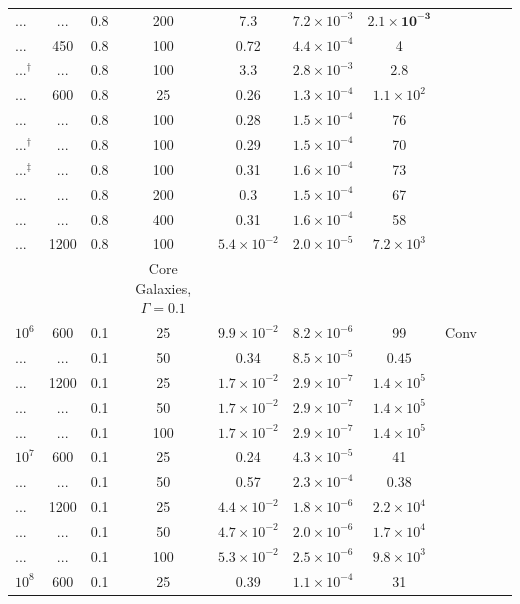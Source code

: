 \documentclass[usenatbib,fleqn]{mn2e}
\begin{document}
\begin{table}
\begin{threeparttable}
\begin{minipage}{18cm}
\begin{tabular}{lccccccccc}
... & ... & 0.8 & 200 & 7.3 & $ 7.2 \times 10^{ -3 }$ & $\mathbf{ 2.1  \times 10^{ -3 }}$ \\
... & 450 & 0.8 & 100 & 0.72 & $ 4.4 \times 10^{ -4 }$ & 4 \\
...$^{\dagger}$ & ... & 0.8 & 100 & 3.3 & $ 2.8 \times 10^{ -3 }$ & $\mathbf{2.8}$\\
... & 600 & 0.8 & 25 & 0.26 & $ 1.3 \times 10^{ -4 }$ & $ 1.1 \times 10^{ 2 }$ \\
... & ... & 0.8 & 100 & 0.28 & $ 1.5 \times 10^{ -4 }$ & 76 \\
...$^{\dagger}$ & ... & 0.8 & 100 & 0.29 & $ 1.5 \times 10^{ -4 }$ &70 \\
...$^{\ddagger}$ & ... & 0.8 & 100 & 0.31 & $ 1.6 \times 10^{ -4 }$ & 73 \\
... & ... & 0.8 & 200 & 0.3 & $ 1.5 \times 10^{ -4 }$ & 67 \\
... & ... & 0.8 & 400 & 0.31 & $ 1.6 \times 10^{ -4 }$ & 58 \\
... & 1200 & 0.8 & 100 & $ 5.4 \times 10^{ -2 }$ & $ 2.0 \times 10^{ -5 }$ & $ 7.2 \times 10^{ 3 }$ \\
  \hline
 & & & Core Galaxies, $\Gamma = 0.1$ & & & & & & \\
$    10^{ 6 }$ & 600 & 0.1 & 25 & $ 9.9 \times 10^{ -2 }$ & $ 8.2\times 10^{ -6 }$ & 99 & Conv\\
... & ... & 0.1 & 50 & 0.34 & $ 8.5 \times 10^{ -5 }$ & $\mathbf{0.45}$ \\
... & 1200 & 0.1 & 25 & $ 1.7 \times 10^{ -2 }$ & $ 2.9 \times 10^{ -7 }$ & $ 1.4 \times 10^{ 5 }$ \\
... & ... & 0.1 & 50 & $ 1.7 \times 10^{ -2 }$ & $ 2.9 \times 10^{ -7 }$ & $ 1.4 \times 10^{ 5 }$ \\
... & ... & 0.1 & 100 & $ 1.7 \times 10^{ -2 }$ & $ 2.9 \times 10^{ -7 }$ & $ 1.4 \times 10^{ 5 }$ \\
$    10^{ 7 }$ & 600 & 0.1 & 25 & 0.24 & $ 4.3 \times 10^{ -5 }$ & 41 \\
... & ... & 0.1 & 50 & 0.57 & $ 2.3 \times 10^{ -4 }$ & $\mathbf{0.38}$ \\
... & 1200 & 0.1 & 25 & $ 4.4 \times 10^{ -2 }$ & $ 1.8 \times 10^{ -6 }$ & $ 2.2 \times 10^{ 4 }$ \\
... & ... & 0.1 & 50 & $ 4.7 \times 10^{ -2 }$ & $ 2.0 \times 10^{ -6 }$ & $ 1.7 \times 10^{ 4 }$ \\
... & ... & 0.1 & 100 & $ 5.3 \times 10^{ -2 }$ & $ 2.5 \times 10^{ -6 }$ & $ 9.8 \times 10^{ 3 }$ \\
$    10^{ 8 }$ & 600 & 0.1 & 25 & 0.39 & $ 1.1 \times 10^{ -4 }$ & 31 \\

\end{tabular}
\end{minipage}
\end{threeparttable}
\end{table}
\end{document}
